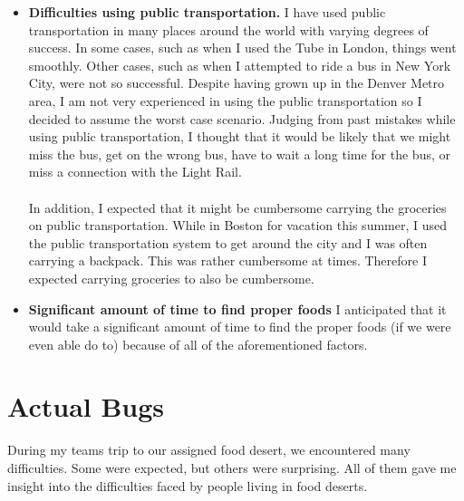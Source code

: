 \documentclass[11pt]{article}
\begin{document}
\begin{itemize}
    \item \textbf{Difficulties using public transportation.} I have used public transportation in
        many places around the world with varying degrees of success. In some cases, such as when I
        used the Tube in London, things went smoothly. Other cases, such as when I attempted to ride
        a bus in New York City, were not so successful. Despite having grown up in the Denver Metro
        area, I am not very experienced in using the public transportation so I decided to assume
        the worst case scenario. Judging from past mistakes while using public transportation, I
        thought that it would be likely that we might miss the bus, get on the wrong bus, have to
        wait a long time for the bus, or miss a connection with the Light Rail.\\
        \\
        In addition, I expected that it might be cumbersome carrying the groceries on public
        transportation. While in Boston for vacation this summer, I used the public transportation
        system to get around the city and I was often carrying a backpack. This was rather
        cumbersome at times. Therefore I expected carrying groceries to also be cumbersome.

    \item \textbf{Significant amount of time to find proper foods} I anticipated that it would take
        a significant amount of time to find the proper foods (if we were even able do to) because
        of all of the aforementioned factors.
\end{itemize}

\section{Actual Bugs}
During my teams trip to our assigned food desert, we encountered many difficulties. Some were
expected, but others were surprising. All of them gave me insight into the difficulties faced by
people living in food deserts.
\end{document}
